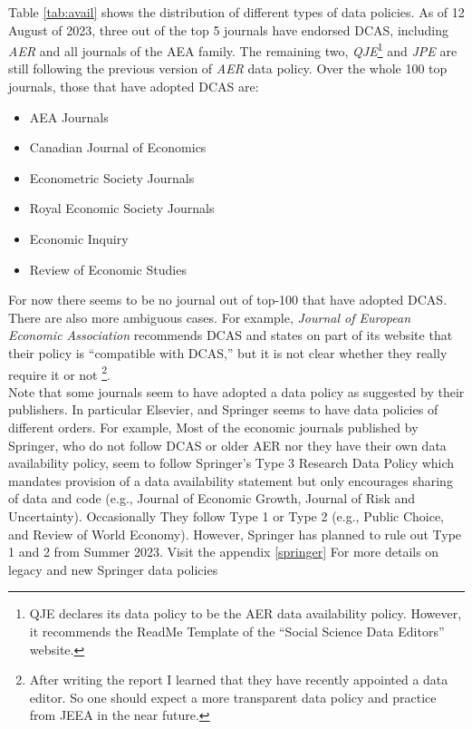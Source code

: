 \documentclass[11pt]{article}
\begin{document}
Table \ref{tab:avail} shows the distribution of different types of data policies. As of 12 August of 2023, three out of the top 5 journals have endorsed DCAS, including \textit{AER} and all journals of the AEA family. The remaining two, \textit{QJE}\footnote{QJE declares its data policy to be the AER data availability policy. However, it recommends the ReadMe Template of the ``Social Science Data Editors'' website.} and \textit{JPE} are still following the previous version of \textit{AER} data policy. Over the whole 100 top journals, those that have adopted DCAS are:
\begin{itemize}
\item AEA Journals
\item Canadian Journal of Economics
\item Econometric Society Journals
\item Royal Economic Society Journals
\item Economic Inquiry
\item Review of Economic Studies
\end{itemize}

For now there seems to be no journal out of top-100 that have adopted DCAS. There are also more ambiguous cases. For example, \textit{Journal of European Economic Association} recommends DCAS and states on part of its website that their policy is ``compatible with DCAS,'' but it is not clear whether they really require it or not \footnote{After writing the report I learned that they have recently appointed a data editor. So one should expect a more transparent data policy and practice from JEEA in the near future.}.\\

Note that some journals seem to have adopted a data policy as suggested by their publishers. In particular Elsevier, and Springer seems to have data policies of different orders. For example, Most of the economic journals published by Springer, who do not follow DCAS or older AER nor they have their own data availability policy, seem to follow Springer's Type 3 Research Data Policy which mandates provision of a data availability statement but only encourages sharing of data and code (e.g., Journal of Economic Growth, Journal of Risk and Uncertainty). Occasionally They follow Type 1 or Type 2 (e.g., Public Choice, and Review of World Economy). However, Springer has planned to rule out Type 1 and 2 from Summer 2023. Visit the appendix \ref{springer} For more details on legacy and new Springer data policies\\
\end{document}
